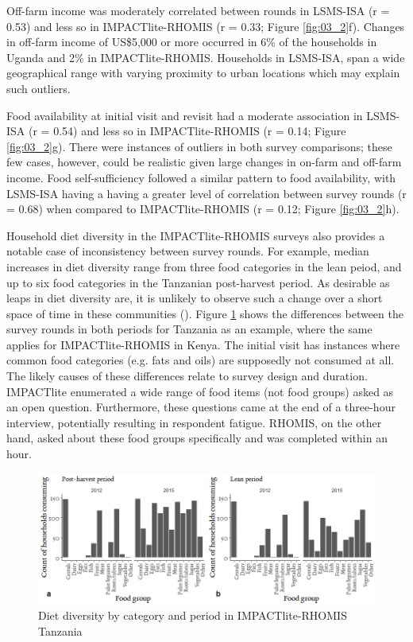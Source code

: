 Off-farm income was moderately correlated between rounds in LSMS-ISA (r = 0.53) and less so in IMPACTlite-RHOMIS (r = 0.33; Figure \ref{fig:03_2}f). Changes in off-farm income of US\$5,000 or more occurred in 6\% of the households in Uganda and 2\% in IMPACTlite-RHOMIS. Households in LSMS-ISA, span a wide geographical range with varying proximity to urban locations which may explain such outliers.

Food availability at initial visit and revisit had a moderate association in LSMS-ISA (r = 0.54) and less so in IMPACTlite-RHOMIS (r = 0.14; Figure \ref{fig:03_2}g). There were instances of outliers in both survey comparisons; these few cases, however, could be realistic given large changes in on-farm and off-farm income. Food self-sufficiency followed a similar pattern to food availability, with LSMS-ISA having a having a greater level of correlation between survey rounds (r = 0.68) when compared to IMPACTlite-RHOMIS (r = 0.12; Figure \ref{fig:03_2}h).

Household diet diversity in the IMPACTlite-RHOMIS surveys also provides a notable case of inconsistency between survey rounds. For example, median increases in diet diversity range from three food categories in the lean peiod, and up to six food categories in the Tanzanian post-harvest period. As desirable as leaps in diet diversity are, it is unlikely to observe such a change over a short space of time in these communities (\citealp{IFAD2016}). Figure \ref{fig:03_3} shows the differences between the survey rounds in both periods for Tanzania as an example, where the same applies for IMPACTlite-RHOMIS in Kenya. The initial visit has instances where common food categories (e.g. fats and oils) are supposedly not consumed at all. The likely causes of these differences relate to survey design and duration. IMPACTlite enumerated a wide range of food items (not food groups) asked as an open question. Furthermore, these questions came at the end of a three-hour interview, potentially resulting in respondent fatigue. RHOMIS, on the other hand, asked about these food groups specifically and was completed within an hour.

\begin{figure}[H]
  \includegraphics[width=1\textwidth]{figs_03/image3_v2.png}
  \captionsetup{singlelinecheck = off, justification=justified}
  \caption{Diet diversity by category and period in IMPACTlite-RHOMIS Tanzania}
  \label{fig:03_3}
\end{figure}


